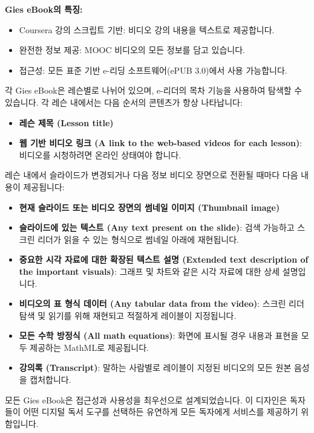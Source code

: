 \documentclass[11pt,a4paper]{article}
\begin{document}
\begin{summarybox}
\textbf{Gies eBook의 특징:}
\begin{itemize}
    \item Coursera 강의 스크립트 기반: 비디오 강의 내용을 텍스트로 제공합니다.
    \item 완전한 정보 제공: MOOC 비디오의 모든 정보를 담고 있습니다.
    \item 접근성: 모든 표준 기반 e-리딩 소프트웨어(ePUB 3.0)에서 사용 가능합니다.
\end{itemize}
\end{summarybox}

각 Gies eBook은 레슨별로 나뉘어 있으며, e-리더의 목차 기능을 사용하여 탐색할 수 있습니다. 각 레슨 내에서는 다음 순서의 콘텐츠가 항상 나타납니다:

\begin{itemize}
    \item \textbf{레슨 제목 (Lesson title)}
    \item \textbf{웹 기반 비디오 링크 (A link to the web-based videos for each lesson)}: 비디오를 시청하려면 온라인 상태여야 합니다.
\end{itemize}

레슨 내에서 슬라이드가 변경되거나 다음 정보 비디오 장면으로 전환될 때마다 다음 내용이 제공됩니다:

\begin{itemize}
    \item \textbf{현재 슬라이드 또는 비디오 장면의 썸네일 이미지 (Thumbnail image)}
    \item \textbf{슬라이드에 있는 텍스트 (Any text present on the slide)}: 검색 가능하고 스크린 리더가 읽을 수 있는 형식으로 썸네일 아래에 재현됩니다.
    \item \textbf{중요한 시각 자료에 대한 확장된 텍스트 설명 (Extended text description of the important visuals)}: 그래프 및 차트와 같은 시각 자료에 대한 상세 설명입니다.
    \item \textbf{비디오의 표 형식 데이터 (Any tabular data from the video)}: 스크린 리더 탐색 및 읽기를 위해 재현되고 적절하게 레이블이 지정됩니다.
    \item \textbf{모든 수학 방정식 (All math equations)}: 화면에 표시될 경우 내용과 표현을 모두 제공하는 MathML로 제공됩니다.
    \item \textbf{강의록 (Transcript)}: 말하는 사람별로 레이블이 지정된 비디오의 모든 원본 음성을 캡처합니다.
\end{itemize}

모든 Gies eBook은 접근성과 사용성을 최우선으로 설계되었습니다. 이 디자인은 독자들이 어떤 디지털 독서 도구를 선택하든 유연하게 모든 독자에게 서비스를 제공하기 위함입니다.
\end{document}
